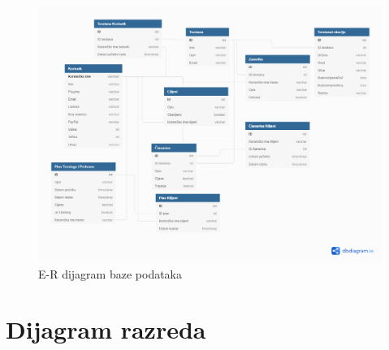 				\begin{figure}[H]
					\hspace*{-1.5cm}
					\includegraphics[scale=0.4]{dijagrami/dijagram_baze_podataka.PNG} %
					\centering
					\caption{E-R dijagram baze podataka}
					\label{fig:promjene}
				\end{figure}
			
			\eject
			
			
		\section{Dijagram razreda}
		
